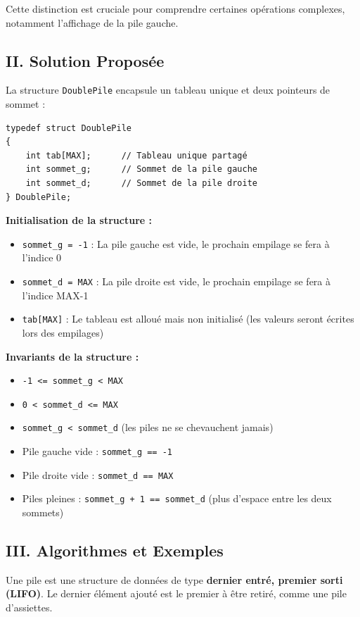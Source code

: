 \documentclass[a4paper, 11pt]{article}
\begin{document}
Cette distinction est cruciale pour comprendre certaines opérations complexes, notamment l'affichage de la pile gauche.

\subsection{II. Solution Proposée}

La structure \texttt{DoublePile} encapsule un tableau unique et deux pointeurs de sommet :

\begin{lstlisting}
typedef struct DoublePile
{
    int tab[MAX];      // Tableau unique partagé
    int sommet_g;      // Sommet de la pile gauche
    int sommet_d;      // Sommet de la pile droite
} DoublePile;
\end{lstlisting}

\textbf{Initialisation de la structure :}
\begin{itemize}
    \item \texttt{sommet\_g = -1} : La pile gauche est vide, le prochain empilage se fera à l'indice 0
    \item \texttt{sommet\_d = MAX} : La pile droite est vide, le prochain empilage se fera à l'indice MAX-1
    \item \texttt{tab[MAX]} : Le tableau est alloué mais non initialisé (les valeurs seront écrites lors des empilages)
\end{itemize}

\textbf{Invariants de la structure :}
\begin{itemize}
    \item \texttt{-1 <= sommet\_g < MAX}
    \item \texttt{0 < sommet\_d <= MAX}
    \item \texttt{sommet\_g < sommet\_d} (les piles ne se chevauchent jamais)
    \item Pile gauche vide : \texttt{sommet\_g == -1}
    \item Pile droite vide : \texttt{sommet\_d == MAX}
    \item Piles pleines : \texttt{sommet\_g + 1 == sommet\_d} (plus d'espace entre les deux sommets)
\end{itemize}

\subsection{III. Algorithmes et Exemples}

Une pile est une structure de données de type \textbf{dernier entré, premier sorti (LIFO)}. Le dernier élément ajouté est le premier à être retiré, comme une pile d'assiettes.
\end{document}
